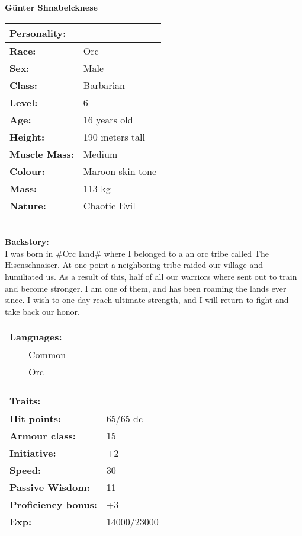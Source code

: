 \documentclass[11pt]{article}
\newcommand{\tabitem}{~~\llap{--}~~}
\begin{document}
	\begin{center}
\Huge \textbf{Günter Shnabelcknese}
	\end{center}
	\begin{multicols}{2}
\noindent \begin{tabularx}{95mm}{@{}l l}
\Large \textbf{Personality:} 	& 						\\
\hline
\textbf{Race:} 					& Orc		 			\\
\textbf{Sex:} 					& Male	 				\\
\textbf{Class:}					& Barbarian				\\
\textbf{Level:} 				& 6						\\
\textbf{Age:} 					& 16 years old			\\
\textbf{Height:} 				& 190 meters tall 		\\
\textbf{Muscle Mass:} 			& Medium 				\\
\textbf{Colour:} 				& Maroon skin tone	 	\\
\textbf{Mass:} 					& 113 kg		 		\\
\textbf{Nature:} 				& Chaotic Evil	 		\\
		\end{tabularx} \\
\textbf{Backstory:} \\
I was born in \#Orc land\# where I belonged to a an orc tribe called The Hisenschnaiser. At one point a neighboring tribe raided our village and humiliated us. As a result of this, half of all our warriors where sent out to train and become stronger. I am one of them, and has been roaming the lands ever since. I wish to one day reach ultimate strength, and I will return to fight and take back our honor.

\vspace{4mm}

\noindent \begin{tabularx}{95mm}{@{}l}
{\Large \textbf{Languages:}} \\
\hline
\tabitem Common \\
\tabitem Orc \\
		\end{tabularx}

\vspace{4mm}

\noindent \begin{tabularx}{95mm}{@{}l l}
\Large \textbf{Traits:}		 	& 									\\
\hline
\textbf{Hit points:} 			& 65/65 dc 							\\
\textbf{Armour class:} 			& 15							 	\\
\textbf{Initiative:} 			& +2								\\
\textbf{Speed:} 				& 30	 							\\
\textbf{Passive Wisdom:} 		& 11			 					\\
\textbf{Proficiency bonus:}		& +3								\\
\textbf{Exp:} 					& 14000/23000 						\\
		\end{tabularx}


\end{multicols}
\end{document}
